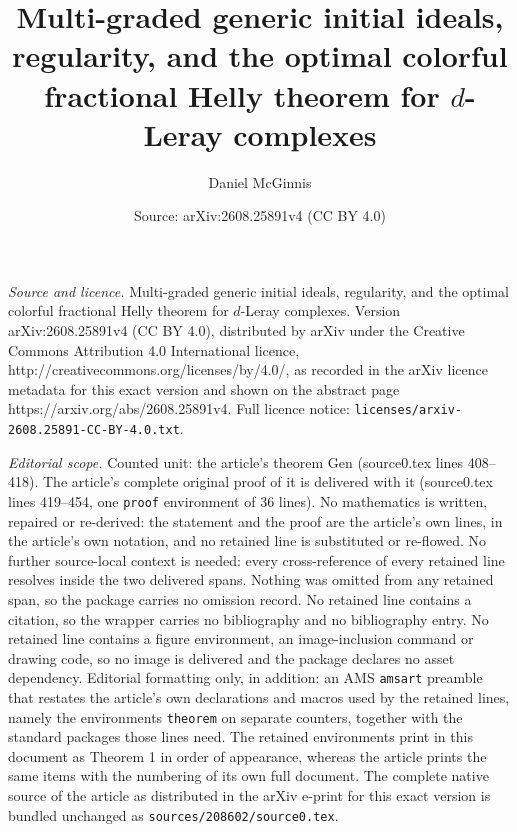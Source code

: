 \documentclass[10pt,a4paper]{amsart}
\title{Multi-graded generic initial ideals, regularity, and the optimal colorful fractional Helly theorem for $d$-Leray complexes}
\author{Daniel McGinnis}
\date{Source: arXiv:2608.25891v4 (CC BY 4.0)}
\begin{document}
\maketitle

\noindent\emph{Source and licence.} Multi-graded generic initial ideals, regularity, and the optimal colorful fractional Helly theorem for $d$-Leray complexes. Version arXiv:2608.25891v4 (CC BY 4.0), distributed by arXiv under the Creative Commons Attribution 4.0 International licence, http://creativecommons.org/licenses/by/4.0/, as recorded in the arXiv licence metadata for this exact version and shown on the abstract page https://arxiv.org/abs/2608.25891v4. Full licence notice: \texttt{licenses/arxiv-2608.25891-CC-BY-4.0.txt}.\par\smallskip

\noindent\textit{Editorial scope.} Counted unit: the article's theorem Gen (source0.tex lines 408--418). The article's complete original proof of it is delivered with it (source0.tex lines 419--454, one \texttt{proof} environment of 36 lines). No mathematics is written, repaired or re-derived: the statement and the proof are the article's own lines, in the article's own notation, and no retained line is substituted or re-flowed.  No further source-local context is needed: every cross-reference of every retained line resolves inside the two delivered spans.  Nothing was omitted from any retained span, so the package carries no omission record.  No retained line contains a citation, so the wrapper carries no bibliography and no bibliography entry.  No retained line contains a figure environment, an image-inclusion command or drawing code, so no image is delivered and the package declares no asset dependency.  Editorial formatting only, in addition: an AMS \texttt{amsart} preamble that restates the article's own declarations and macros used by the retained lines, namely the environments \texttt{theorem} on separate counters, together with the standard packages those lines need.  The retained environments print in this document as Theorem 1 in order of appearance, whereas the article prints the same items with the numbering of its own full document.  The complete native source of the article as distributed in the arXiv e-print for this exact version is bundled unchanged as \texttt{sources/208602/source0.tex}.
\end{document}
